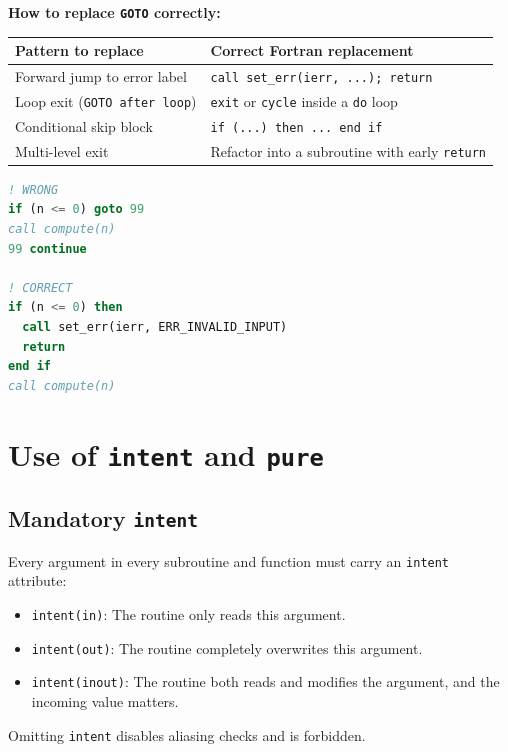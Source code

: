\documentclass{article}
\begin{document}
\textbf{How to replace \texttt{GOTO} correctly:}

\begin{tabular}{ll}
\toprule
Pattern to replace & Correct Fortran replacement \\
\midrule
Forward jump to error label & \texttt{call set\_err(ierr, ...); return} \\
Loop exit (\texttt{GOTO after loop}) & \texttt{exit} or \texttt{cycle} inside a \texttt{do} loop \\
Conditional skip block & \texttt{if (...) then ... end if} \\
Multi-level exit & Refactor into a subroutine with early \texttt{return} \\
\bottomrule
\end{tabular}

\begin{lstlisting}[language=Fortran]
! WRONG
if (n <= 0) goto 99
call compute(n)
99 continue

! CORRECT
if (n <= 0) then
  call set_err(ierr, ERR_INVALID_INPUT)
  return
end if
call compute(n)
\end{lstlisting}

\section{Use of \texttt{intent} and \texttt{pure}}

\subsection{Mandatory \texttt{intent}}

Every argument in every subroutine and function must carry an \texttt{intent} attribute:

\begin{itemize}
  \item \texttt{intent(in)}: The routine only reads this argument.
  \item \texttt{intent(out)}: The routine completely overwrites this argument.
  \item \texttt{intent(inout)}: The routine both reads and modifies the argument, and the incoming value matters.
\end{itemize}

Omitting \texttt{intent} disables aliasing checks and is forbidden.
\end{document}
